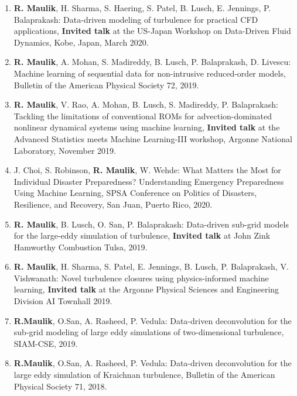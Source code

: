 \documentclass[letterpaper]{article}
\begin{document}
\begin{enumerate}

\item \textbf{R. Maulik}, H. Sharma, S. Haering, S. Patel, B. Lusch, E. Jennings, P. Balaprakash: Data-driven modeling of turbulence for practical CFD applications, \textbf{Invited talk} at the US-Japan Workshop on Data-Driven Fluid Dynamics, Kobe, Japan, March 2020.

\item \textbf{R. Maulik}, A. Mohan, S. Madireddy, B. Lusch, P. Balaprakash, D. Livescu: Machine learning of sequential data for non-intrusive reduced-order models, Bulletin of the American Physical Society 72, 2019.

\item \textbf{R. Maulik}, V. Rao, A. Mohan, B. Lusch, S. Madireddy, P. Balaprakash: Tackling the limitations of conventional ROMs for advection-dominated nonlinear dynamical systems using machine learning, \textbf{Invited talk} at the Advanced Statistics meets Machine Learning-III workshop, Argonne National Laboratory, November 2019.

\item J. Choi, S. Robinson, \textbf{R. Maulik}, W. Wehde: What Matters the Most for Individual Disaster Preparedness? Understanding Emergency Preparedness Using Machine Learning, SPSA Conference on Politics of Disasters, Resilience, and Recovery, San Juan, Puerto Rico, 2020.

\item \textbf{R. Maulik}, B. Lusch, O. San, P. Balaprakash: Data-driven sub-grid models for the large-eddy simulation of turbulence, \textbf{Invited talk} at John Zink Hamworthy Combustion Tulsa, 2019.

\item \textbf{R. Maulik}, H. Sharma, S. Patel, E. Jennings, B. Lusch, P. Balaprakash, V. Vishwanath: Novel turbulence closures using physics-informed machine learning, \textbf{Invited talk} at the Argonne Physical Sciences and Engineering Division AI Townhall 2019. 

\item \textbf{R.Maulik}, O.San, A. Rasheed, P. Vedula: Data-driven deconvolution for the sub-grid modeling of large eddy simulations of two-dimensional turbulence, SIAM-CSE, 2019.

\item \textbf{R.Maulik}, O.San, A. Rasheed, P. Vedula: Data-driven deconvolution for the large eddy simulation of Kraichnan turbulence, Bulletin of the American Physical Society 71, 2018.


\end{enumerate}
\end{document}
